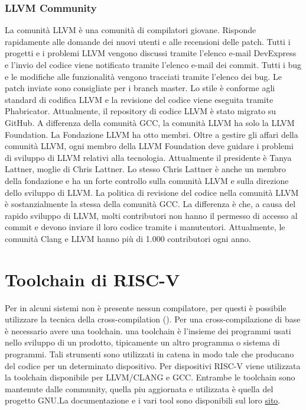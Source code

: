 \documentclass[12pt,a4paper]{report}
\begin{document}
\subsubsection{LLVM Community}
La comunità LLVM è una comunità di compilatori giovane. Risponde rapidamente alle domande dei nuovi utenti e alle recensioni delle patch. 
Tutti i progetti e i problemi LLVM vengono discussi tramite l'elenco e-mail DevExpress e l'invio del codice viene notificato tramite l'elenco e-mail dei commit. Tutti i bug e le modifiche alle funzionalità vengono tracciati tramite l'elenco dei bug. Le patch inviate sono consigliate per i branch master. Lo stile è conforme agli standard di codifica LLVM e la revisione del codice viene eseguita tramite Phabricator. Attualmente, il repository di codice LLVM è stato migrato su GitHub.
A differenza della comunità GCC, la comunità LLVM ha solo la LLVM Foundation. La Fondazione LLVM ha otto membri. Oltre a gestire gli affari della comunità LLVM, ogni membro della LLVM Foundation deve guidare i problemi di sviluppo di LLVM relativi alla tecnologia. Attualmente il presidente è Tanya Lattner, moglie di Chris Lattner. Lo stesso Chris Lattner è anche un membro della fondazione e ha un forte controllo sulla comunità LLVM e sulla direzione dello sviluppo di LLVM.
La politica di revisione del codice nella comunità LLVM è sostanzialmente la stessa della comunità GCC. La differenza è che, a causa del rapido sviluppo di LLVM, molti contributori non hanno il permesso di accesso al commit e devono inviare il loro codice tramite i manutentori. Attualmente, le comunità Clang e LLVM hanno più di 1.000 contributori ogni anno. 


\section{Toolchain di RISC-V}
Per in alcuni sistemi non è presente nessun compilatore, per questi è possibile utilizzare la tecnica della cross-compilation ().  Per una cross-compilazione di base è necessario avere una toolchain. una toolchain è l'insieme dei programmi usati nello sviluppo di un prodotto, tipicamente un altro programma o sistema di programmi. Tali strumenti sono utilizzati in catena in modo tale che producano del codice per un determinato dispositivo.
Per dispositivi RISC-V viene utilizzata la toolchain disponibile per LLVM/CLANG e GCC. Entrambe le toolchain sono mantenute dalle community, quella piu aggiornata e utilizzata è quella del progetto GNU.La documentazione e i vari tool sono disponibili sul loro \href{ http://riscv.org/software-tools/}{sito}.
\end{document}
